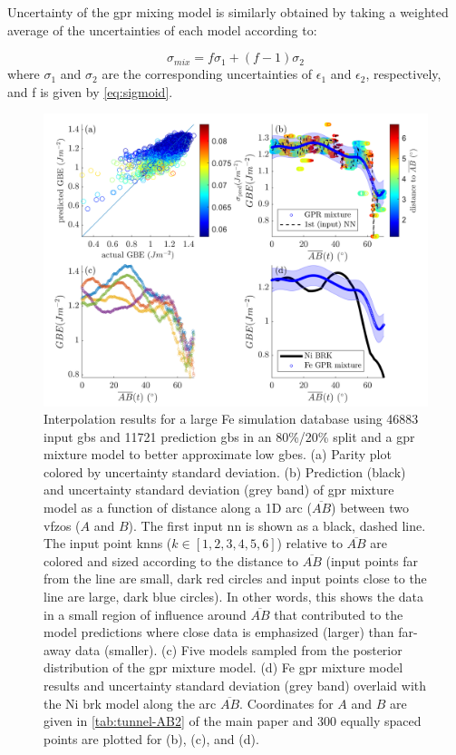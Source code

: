 \documentclass[preprint,12pt]{elsarticle}
\newcommand{\inpt}{input}
\newcommand{\outpt}{prediction}
\begin{document}
Uncertainty of the \gls{gpr} mixing model is similarly obtained by taking a weighted average of the uncertainties of each model according to:

\begin{equation}
    \sigma_{mix} = f \sigma_1+(f-1) \sigma_2
    \label{eq:gprmix-sigma}
\end{equation}
where $\sigma_1$ and $\sigma_2$ are the corresponding uncertainties of $\epsilon_1$ and $\epsilon_2$, respectively, and f is given by \cref{eq:sigmoid}.

\begin{figure}
    \centering
    \includegraphics{figures/kim-interp-posterior.png}
    \caption{Interpolation results for a large Fe simulation database \cite{kimPhasefieldModeling3D2014} using \num{46883} \inpt{} \glspl{gb} and \num{11721} \outpt{} \glspl{gb} in an 80\%/20\% split and a \gls{gpr} mixture model to better approximate low \glspl{gbe}. (a) Parity plot colored by uncertainty standard deviation. (b) Prediction (black) and uncertainty standard deviation (grey band) of \gls{gpr} mixture model as a function of distance along a 1D arc ($\overline{AB}$) between two \glspl{vfzo} ($A$ and $B$). The first \inpt{} \gls{nn} is shown as a black, dashed line. The \inpt{} point \glspl{knn} ($k\in[1,2,3,4,5,6]$) relative to $\overline{AB}$ are colored and sized according to the distance to $\overline{AB}$ (\inpt{} points far from the line are small, dark red circles and \inpt{} points close to the line are large, dark blue circles). In other words, this shows the data in a small region of influence around $\overline{AB}$ that contributed to the model predictions where close data is emphasized (larger) than far-away data (smaller). (c)
    Five models sampled from the posterior distribution of the \gls{gpr} mixture model. (d) Fe \gls{gpr} mixture model results and uncertainty standard deviation (grey band) overlaid with the Ni \gls{brk} model along the arc $\overline{AB}$. Coordinates for $A$ and $B$ are given in \cref{tab:tunnel-AB2} of the main paper and 300 equally spaced points are plotted for (b), (c), and (d).}
    \label{fig:kim-interp-posterior}
\end{figure}
\end{document}
